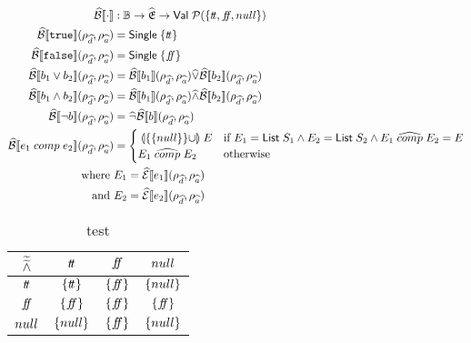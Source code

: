 \begin{align}
    \absboolsem{\cdot} &: \mathbb{B} \rightarrow \ab{\mathfrak{E}} \rightarrow \mathsf{Val} \; \mathcal{P}(\{\true, \false, null\}) \\
    \absboolsem{\texttt{true}}(\rho_{\ab{d}}, \rho_{\ab{a}}) &= \mathsf{Single} \; \{\true\} \label{eq:abstract-bool-semantics-start} \\
    \absboolsem{\texttt{false}}(\rho_{\ab{d}}, \rho_{\ab{a}}) &= \mathsf{Single} \; \{\false\} \\
    \absboolsem{b_1 \lor b_2}(\rho_{\ab{d}}, \rho_{\ab{a}}) &= \absboolsem{b_1}(\rho_{\ab{d}}, \rho_{\ab{a}}) \ab{\lor} \absboolsem{b_2}(\rho_{\ab{d}}, \rho_{\ab{a}}) \\
    \absboolsem{b_1 \land b_2}(\rho_{\ab{d}}, \rho_{\ab{a}}) &= \absboolsem{b_1}(\rho_{\ab{d}}, \rho_{\ab{a}}) \ab{\land} \absboolsem{b_2}(\rho_{\ab{d}}, \rho_{\ab{a}}) \\
    \absboolsem{\neg b}(\rho_{\ab{d}}, \rho_{\ab{a}}) &= \ab{\neg} \absboolsem{b}(\rho_{\ab{d}}, \rho_{\ab{a}}) \label{eq:abstract-bool-natural} \\
    \absboolsem{e_1 \;comp\; e_2}(\rho_{\ab{d}}, \rho_{\ab{a}}) &=
    \begin{cases}
        \app{\{\{null\}\} \cup} E & \text{if } E_1 = \mathsf{List} \; S_1 \land E_2 = \mathsf{List} \; S_2 \land E_1 \;\ab{\comp}\; E_2 = E\\
        E_1 \;\ab{\comp}\; E_2 & \text{otherwise}\\
    \end{cases}\label{eq:abstract-bool-semantics-end2} \\
    \text{where } & E_1 = \absexpsem{e_1}(\rho_{\ab{d}}, \rho_{\ab{a}}) \\
    \text{and } & E_2 = \absexpsem{e_2}(\rho_{\ab{d}}, \rho_{\ab{a}})
\end{align}

\begin{table}[H]
    \centering
    \caption{test}
    \begin{tabular}{c|ccc}
        $\widetilde{\widetilde{\land}}$ & $t\!t$ & $f\!\!f$ & $null$ \\
        \hline
        $t\!t$ & $\{t\!t\}$ & $\{f\!\!f\}$ & $\{null\}$ \\
        $f\!\!f$ & $\{f\!\!f\}$ & $\{f\!\!f\}$ & $\{f\!\!f\}$ \\
        $null$ & $\{null\}$ & $\{f\!\!f\}$ & $\{null\}$ \\
    \end{tabular}
    \label{tab:aaabland}
\end{table}

